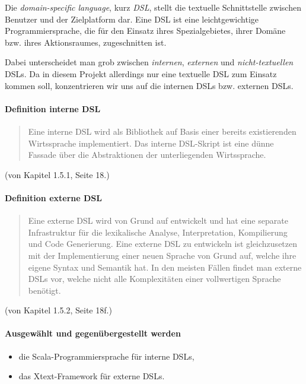 Die \emph{domain-specific language}, kurz \emph{DSL}, stellt die
textuelle Schnittstelle zwischen Benutzer und der Zielplatform dar.
Eine DSL ist eine leichtgewichtige Programmiersprache, die für den
Einsatz ihres Spezialgebietes, ihrer Domäne bzw. ihres Aktionsraumes,
zugeschnitten ist.

Dabei unterscheidet man grob zwischen \emph{internen}, \emph{externen}
und \emph{nicht-textuellen} DSLs.\cite{dsls} Da in diesem Projekt allerdings
nur eine textuelle DSL zum Einsatz kommen soll, konzentrieren wir uns
auf die internen DSLs bzw. externen DSLs.

\paragraph{Definition interne DSL}
\begin{quote}
Eine interne DSL wird als Bibliothek auf Basis
einer bereits existierenden Wirtssprache implementiert. Das interne DSL-Skript
ist eine dünne Fassade über die Abstraktionen der unterliegenden Wirtssprache.
\end{quote} (von \cite{dsls} Kapitel 1.5.1, Seite 18.)

\paragraph{Definition externe DSL}
\begin{quote}
Eine externe DSL wird von Grund auf entwickelt und hat eine separate
Infrastruktur für die lexikalische Analyse, Interpretation, Kompilierung
und Code Generierung. Eine externe DSL zu entwickeln ist gleichzusetzen mit
der Implementierung einer neuen Sprache von Grund auf, welche ihre eigene
Syntax und Semantik hat.
In den meisten Fällen findet man externe DSLs vor, welche nicht alle
Komplexitäten einer vollwertigen Sprache benötigt.
\end{quote} (von \cite{dsls} Kapitel 1.5.2, Seite 18f.)

\paragraph{Ausgewählt und gegenübergestellt werden}

\begin{itemize}
  \item die Scala-Programmiersprache für interne DSLs,
  \item das Xtext-Framework für externe DSLs.
\end{itemize}

